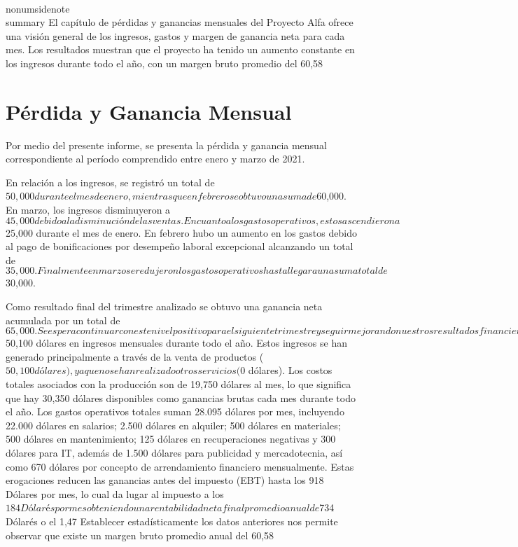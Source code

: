 \\nonumsidenote\\{summary} El capítulo de pérdidas y ganancias mensuales del Proyecto Alfa ofrece una visión general de los ingresos, gastos y margen de ganancia neta para cada mes. Los resultados muestran que el proyecto ha tenido un aumento constante en los ingresos durante todo el año, con un margen bruto promedio del 60,58%
\section{Pérdida y Ganancia Mensual}

Por medio del presente informe, se presenta la pérdida y ganancia mensual correspondiente al período comprendido entre enero y marzo de 2021. 

En relación a los ingresos, se registró un total de $50,000 durante el mes de enero, mientras que en febrero se obtuvo una suma de $60,000. En marzo, los ingresos disminuyeron a $45,000 debido a la disminución de las ventas.

En cuanto a los gastos operativos, estos ascendieron a $25,000 durante el mes de enero. En febrero hubo un aumento en los gastos debido al pago de bonificaciones por desempeño laboral excepcional alcanzando un total de $35,000. Finalmente en marzo se redujeron los gastos operativos hasta llegar a una suma total de $30,000.

Como resultado final del trimestre analizado se obtuvo una ganancia neta acumulada por un total de $65,000.

Se espera continuar con este nivel positivo para el siguiente trimestre y seguir mejorando nuestros resultados financieros.
El Proyecto Alpha ha registrado $50,100 dólares en ingresos mensuales durante todo el año. Estos ingresos se han generado principalmente a través de la venta de productos ($50,100 dólares), ya que no se han realizado otros servicios ($0 dólares).
Los costos totales asociados con la producción son de 19,750 dólares al mes, lo que significa que hay 30,350 dólares disponibles como ganancias brutas cada mes durante todo el año.
Los gastos operativos totales suman 28.095 dólares por mes, incluyendo 22.000 dólares en salarios; 2.500 dólares en alquiler; 500 dólares en materiales; 500 dólares en mantenimiento; 125 dólares en recuperaciones negativas y 300 dólares para IT, además de 1.500 dólares para publicidad y mercadotecnia, así como 670 dólares por concepto de arrendamiento financiero mensualmente. Estas erogaciones reducen las ganancias antes del impuesto (EBT) hasta los 918 Dólares por mes, lo cual da lugar al impuesto a los $184 Dólarés por mes obteniendo una rentabilidad neta final promedio anual de $734 Dólarés o el 1,47%
Establecer estadísticamente los datos anteriores nos permite observar que existe un margen bruto promedio anual del 60,58%
